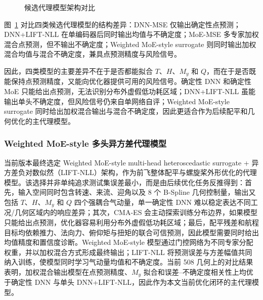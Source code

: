 \begin{figure}[H]
{
  }
  \caption{候选代理模型架构对比}
  \label{fig:candidate_model_architectures}
\end{figure}

图~\ref{fig:candidate_model_architectures} 对比四类候选代理模型的结构差异：DNN-MSE 仅输出确定性点预测；DNN+LIFT-NLL 在单编码器后同时输出均值与不确定度；MoE-MSE 多专家加权混合点预测，但不输出不确定度；Weighted MoE-style surrogate 则同时输出加权混合均值与混合不确定度，兼具点预测精度与风险信号。

因此，四类模型的主要差异不在于是否都能拟合 $T$、$H$、$M_y$ 和 $Q$，而在于是否既能保持点预测精度，又能向优化器提供可用的风险信号。确定性 DNN 和确定性 MoE 只能给出点预测，无法识别分布外虚假低功耗区域；DNN+LIFT-NLL 虽能输出单头不确定度，但风险信号仍来自单网络自评；Weighted MoE-style surrogate 同时给出加权混合输出与混合不确定度，因此更适合作为后续配平和几何优化的主代理模型。

\subsubsection{Weighted MoE-style 多头异方差代理模型}

当前版本最终选定 Weighted MoE-style multi-head heteroscedastic surrogate + 异方差负对数似然（LIFT-NLL）架构，作为前飞整体配平与螺旋桨外形优化的代理模型。该选择并非单纯追求测试集误差最小，而是由后续优化任务反推得到：首先，输入空间同时包含转速、来流、迎角以及 8 个 B-Spline 几何控制量，输出又包括 $T$、$H$、$M_y$ 和 $Q$ 四个强耦合气动量，单一确定性 DNN 难以稳定表达不同工况/几何区域内的响应差异；其次，CMA-ES 会主动探索训练分布边界，如果模型只能给出点预测，优化器容易利用分布外虚假低功耗区域；最后，配平残差和航程目标均依赖推力、法向力、俯仰矩与扭矩的联合可信预测，因此模型需要同时给出均值精度和置信度诊断。Weighted MoE-style 模型通过门控网络为不同专家分配权重，并以加权混合方式形成最终输出；LIFT-NLL 将预测误差与方差幅值共同纳入训练，使模型同时学习气动量均值和不确定度。当前 508 几何上的对比结果表明，加权混合输出模型在点预测精度、$M_y$ 拟合和误差--不确定度相关性上均优于确定性 DNN 与单头 DNN+LIFT-NLL，因此作为本文当前优化闭环的主代理模型。

